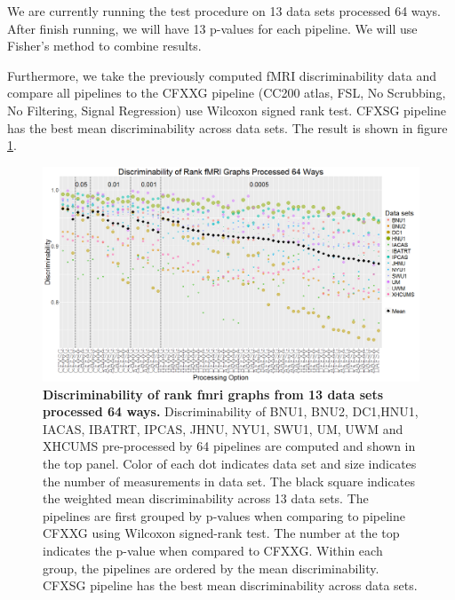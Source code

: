 \documentclass[simplex.tex]{subfiles}
\begin{document}
We are currently running the test procedure on 13 data sets
processed 64 ways. After finish running, we will have 13 p-values
for each pipeline. We will use Fisher’s method to combine
results.  


Furthermore, we take the previously computed fMRI
discriminability data and compare all pipelines to the CFXXG
pipeline (CC200 atlas, FSL, No Scrubbing, No Filtering, Signal
Regression) use Wilcoxon signed rank test. CFXSG pipeline has the
best mean discriminability across data sets. The result is shown
in figure \ref{fig:pipes}.


\begin{figure}[h!]
\begin{cframed}
\centering
\includegraphics[width=\textwidth]{../../figs/pipes.png}
\caption{
{\bf Discriminability of rank fmri graphs from 13 data sets processed 64 ways.}  Discriminability of BNU1, BNU2, DC1,HNU1, IACAS, IBATRT, IPCAS, JHNU, NYU1, SWU1, UM, UWM and XHCUMS pre-processed by 64 pipelines are computed and shown in the top panel. Color of each dot indicates data set and size indicates the number of measurements in data set. The black square indicates the weighted mean discriminability across 13 data sets. The pipelines are first grouped by p-values when comparing to pipeline CFXXG using Wilcoxon signed-rank test. The number at the top indicates the p-value when compared to CFXXG. Within each group, the pipelines are ordered by the mean discriminability. CFXSG pipeline has the best mean discriminability across data sets.}
\label{fig:pipes}
\end{cframed}
\end{figure}
\end{document}
